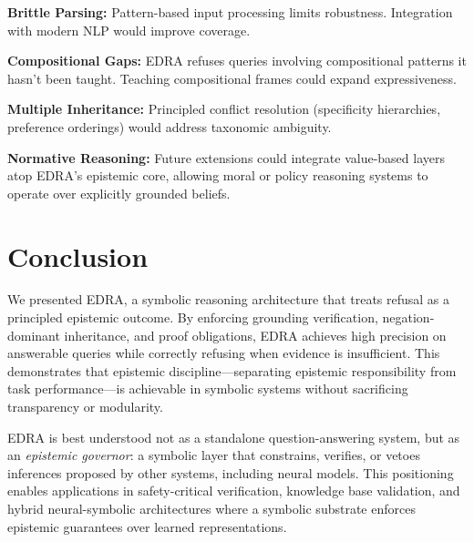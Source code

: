 \documentclass[11pt]{article}
\begin{document}
\textbf{Brittle Parsing:} Pattern-based input processing limits robustness. Integration with modern NLP would improve coverage.

\textbf{Compositional Gaps:} EDRA refuses queries involving compositional patterns it hasn't been taught. Teaching compositional frames could expand expressiveness.

\textbf{Multiple Inheritance:} Principled conflict resolution (specificity hierarchies, preference orderings) would address taxonomic ambiguity.

\textbf{Normative Reasoning:} Future extensions could integrate value-based layers atop EDRA's epistemic core, allowing moral or policy reasoning systems to operate over explicitly grounded beliefs.

\section{Conclusion}

We presented EDRA, a symbolic reasoning architecture that treats refusal as a principled epistemic outcome. By enforcing grounding verification, negation-dominant inheritance, and proof obligations, EDRA achieves high precision on answerable queries while correctly refusing when evidence is insufficient. This demonstrates that epistemic discipline—separating epistemic responsibility from task performance—is achievable in symbolic systems without sacrificing transparency or modularity.

EDRA is best understood not as a standalone question-answering system, but as an \emph{epistemic governor}: a symbolic layer that constrains, verifies, or vetoes inferences proposed by other systems, including neural models. This positioning enables applications in safety-critical verification, knowledge base validation, and hybrid neural-symbolic architectures where a symbolic substrate enforces epistemic guarantees over learned representations.
\end{document}
